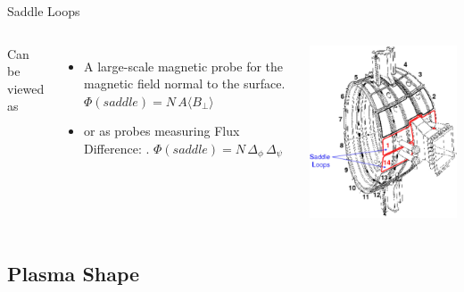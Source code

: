\documentclass{beamer}
\begin{document}
\begin{frame}{Saddle Loops}%
\begin{columns}
	Can be viewed as
     	\begin{itemize}
		\item  A large-scale magnetic probe for the magnetic field normal to the surface. $\Phi(saddle) = N \, A \langle B_{\perp} \rangle $
		\item or as probes measuring Flux Difference: . $\Phi(saddle) = N \,  \Delta_\phi \,  \Delta_\psi $
	\end{itemize}
	\begin{center}
	\includegraphics[width=0.6\columnwidth]{Saddle.png}
	\end{center}

\end{columns}
\end{frame}

\subsection{Plasma Shape }
\end{document}
